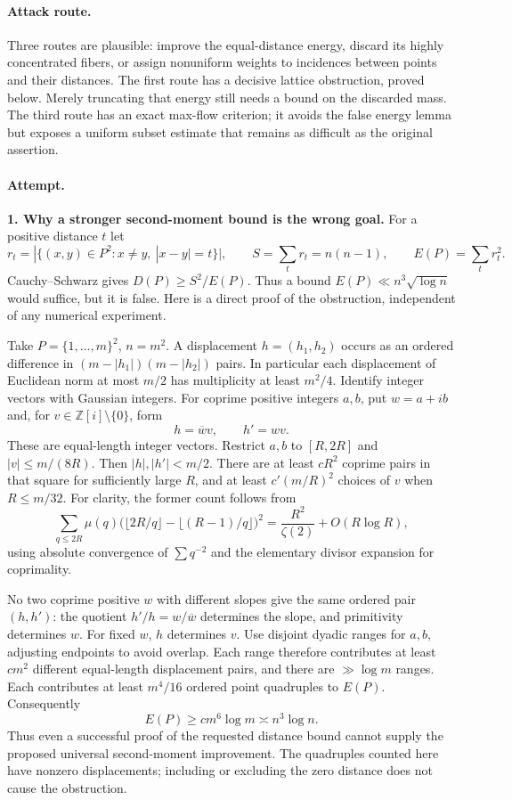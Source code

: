 \documentclass[11pt,a4paper]{article}
\newcommand{\Z}{\mathbb{Z}}
\numberwithin{equation}{section}
\begin{document}
\paragraph{Attack route.}
Three routes are plausible: improve the equal-distance energy, discard
its highly concentrated fibers, or assign nonuniform weights to incidences
between points and their distances. The first route has a decisive lattice
obstruction, proved below. Merely truncating that energy still needs a
bound on the discarded mass. The third route has an exact max-flow
criterion; it avoids the false energy lemma but exposes a uniform subset
estimate that remains as difficult as the original assertion.

\paragraph{Attempt.}
\textbf{1. Why a stronger second-moment bound is the wrong goal.}
For a positive distance $t$ let
\[
 r_t=|\{(x,y)\in P^2:x\ne y,\ |x-y|=t\}|,
 \qquad S=\sum_t r_t=n(n-1),\qquad E(P)=\sum_t r_t^2.
\]
Cauchy--Schwarz gives $D(P)\ge S^2/E(P)$. Thus a bound
$E(P)\ll n^3\sqrt{\log n}$ would suffice, but it is false.
Here is a direct proof of the obstruction, independent of any numerical
experiment.

Take $P=\{1,\ldots,m\}^2$, $n=m^2$. A displacement
$h=(h_1,h_2)$ occurs as an ordered difference in
$(m-|h_1|)(m-|h_2|)$ pairs. In particular each displacement of Euclidean
norm at most $m/2$ has multiplicity at least $m^2/4$. Identify integer
vectors with Gaussian integers. For coprime positive integers $a,b$,
put $w=a+ib$ and, for $v\in\Z[i]\setminus\{0\}$, form
\[
 h=\overline w v,\qquad h'=wv.
\]
These are equal-length integer vectors. Restrict $a,b$ to $[R,2R]$ and
$|v|\le m/(8R)$. Then $|h|,|h'|<m/2$. There are at least $cR^2$
coprime pairs in that square for sufficiently large $R$, and at least
$c'(m/R)^2$ choices of $v$ when $R\le m/32$. For clarity, the former
count follows from
\[
 \sum_{q\le2R}\mu(q)
 \bigl(\lfloor2R/q\rfloor-\lfloor(R-1)/q\rfloor\bigr)^2
 =\frac{R^2}{\zeta(2)}+O(R\log R),
\]
using absolute convergence of $\sum q^{-2}$ and the elementary divisor
expansion for coprimality.

No two coprime positive $w$ with different slopes give the same ordered
pair $(h,h')$: the quotient $h'/h=w/\overline w$ determines the slope,
and primitivity determines $w$. For fixed $w$, $h$ determines $v$.
Use disjoint dyadic ranges for $a,b$, adjusting endpoints to avoid overlap.
Each range therefore contributes at least $cm^2$ different equal-length
displacement pairs, and there are $\gg\log m$ ranges. Each contributes
at least $m^4/16$ ordered point quadruples to $E(P)$. Consequently
\begin{equation}\label{statement:lattice}
 E(P)\ge c m^6\log m\asymp n^3\log n.
\end{equation}
Thus even a successful proof of the requested distance bound cannot
supply the proposed universal second-moment improvement. The quadruples
counted here have nonzero displacements; including or excluding the zero
distance does not cause the obstruction.
\end{document}
